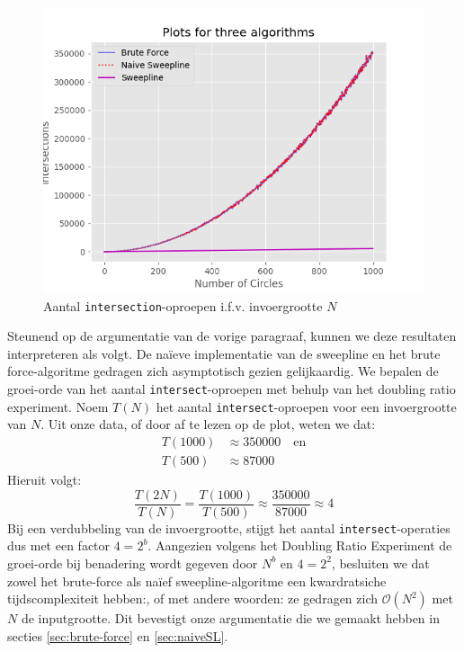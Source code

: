 \documentclass[12pt]{article}
\begin{document}
\begin{figure}
	\centering
	\includegraphics[width=\linewidth]{../plots/ThreeAlgorithmsVisualised.png}
	\caption{Aantal \texttt{intersection}-oproepen i.f.v. invoergrootte $N$}
	\label{fig:IntersectionsIfvN}
\end{figure}

Steunend op de argumentatie van de vorige paragraaf, kunnen we deze resultaten interpreteren als volgt. De naïeve implementatie van de sweepline en het brute force-algoritme gedragen zich asymptotisch gezien gelijkaardig. We bepalen de groei-orde van het aantal \texttt{intersect}-oproepen met behulp van het doubling ratio experiment. Noem $T(N)$ het aantal \texttt{intersect}-oproepen voor een invoergrootte van $N$. Uit onze data, of door af te lezen op de plot, weten we dat:
\begin{align*}
T(1000) &\approx 350000 \quad\text{en}\\
T(500) &\approx 87000
\end{align*}
Hieruit volgt:
\begin{equation*}
\frac{T(2N)}{T(N)} = \frac{T(1000)}{T(500)} \approx \frac{350000}{87000} \approx 4
\end{equation*}
Bij een verdubbeling van de invoergrootte, stijgt het aantal \texttt{intersect}-operaties dus met een factor $4  =2^b$. Aangezien volgens het Doubling Ratio Experiment de groei-orde bij benadering wordt gegeven door $N^b$ en $4 = 2^2$, besluiten we dat zowel het brute-force als naïef sweepline-algoritme een kwardratsiche tijdscomplexiteit hebben:, of met andere woorden: ze gedragen zich $\mathcal{O}(N^2)$ met $N$ de inputgrootte. Dit bevestigt onze argumentatie die we gemaakt hebben in secties \ref{sec:brute-force} en \ref{sec:naiveSL}.
\end{document}
